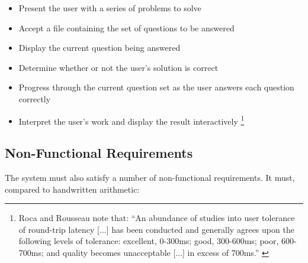 \documentclass[12pt,twoside,notitlepage,xetex]{report}
\begin{document}
\begin{itemize}
\item Present the user with a series of problems to solve
\item Accept a file containing the set of questions to be answered
\item Display the current question being answered
\item Determine whether or not the user's solution is correct
\item Progress through the current question set as the user answers each question correctly
\item Interpret the user's work and display the result interactively \footnote{Roca and Rousseau note that: ``An abundance of studies into user tolerance of round-trip latency [...] has been conducted and generally agrees upon the following levels of tolerance: excellent, 0-300ms; good, 300-600ms; poor, 600-700ms; and quality becomes unacceptable [...] in excess of 700ms.'' \cite{Roca2004}}
\end{itemize}

\subsection{Non-Functional Requirements}

The system must also satisfy a number of non-functional requirements.  It must, compared to handwritten arithmetic:
\end{document}
